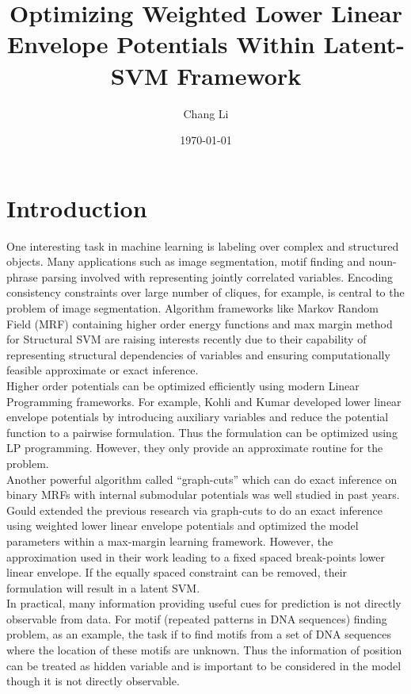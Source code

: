 \documentclass{article}
\title{Optimizing Weighted Lower Linear Envelope Potentials Within Latent-SVM Framework}
\author{Chang Li}
\date{\today}
\begin{document}
	\maketitle
	
	\section{Introduction}
	One interesting task in machine learning is labeling over complex and structured objects. Many applications such as image segmentation, motif finding and noun-phrase parsing involved with representing jointly correlated variables. Encoding consistency constraints over large number of cliques, for example, is central to the problem of image segmentation. Algorithm frameworks like Markov Random Field (MRF) containing higher order energy functions and max margin method for Structural SVM are raising interests recently due to their capability of representing structural dependencies of variables and ensuring computationally feasible approximate or exact inference. \\
	Higher order potentials can be optimized efficiently using modern Linear Programming frameworks. For example, Kohli and Kumar\cite{kohli2009robust} developed lower linear envelope potentials by introducing auxiliary variables and reduce the potential function to a pairwise formulation. Thus the formulation can be optimized using LP programming. However, they only provide an approximate routine for the problem.\\ Another powerful algorithm called “graph-cuts” which can do exact inference on binary MRFs with internal submodular potentials was well studied in past years. Gould\cite{gouldlearning} extended the previous research via graph-cuts to do an exact inference using weighted lower linear envelope potentials and optimized the model parameters within a max-margin learning framework. However, the approximation used in their work leading to a fixed spaced break-points lower linear envelope. If the equally spaced constraint can be removed, their formulation will result in a latent SVM.\\
	In practical, many information providing useful cues for prediction is not directly observable from data. For motif (repeated patterns in DNA sequences) finding problem, as an example, the task if to find motifs from a set of DNA sequences where the location of these motifs are unknown. Thus the information of position can be treated as hidden variable and is important to be considered in the model though it is not directly observable. \\
\end{document}
